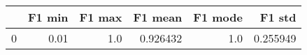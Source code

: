 \begin{tabular}{lrrrrr}
\toprule
{} &  F1 min &  F1 max &   F1 mean &  F1 mode &    F1 std \\
\midrule
0 &    0.01 &     1.0 &  0.926432 &      1.0 &  0.255949 \\
\bottomrule
\end{tabular}
